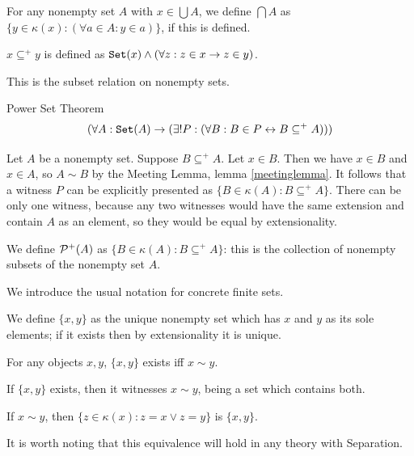 \documentclass[12pt]{article}
\begin{document}
\begin{dfn}  For any nonempty set $A$ with $x \in \bigcup A$, we define  %
$\bigcap A$ as $\{y \in \kappa(x):(\forall a \in A:y \in a)\}$, if this is defined.\end{dfn}

\begin{dfn}  $x \subseteq^+ y$ is defined as ${\tt Set}(x) \wedge (\forall z:z \in x \rightarrow z \in y)$.\end{dfn}  This is the subset relation on nonempty sets.

\begin{thm} Power Set Theorem   $$(\forall A:{\tt Set}(A) \rightarrow (\exists! P:(\forall B:B \in P \leftrightarrow B \subseteq^+ A)))$$  
\end{thm}
  

\Proof

Let $A$ be a nonempty set.  Suppose $B \subseteq^+ A$.  Let $x \in B$.
Then we have $x \in B$ and $x \in A$, so $A \sim B$ by the Meeting
Lemma, lemma \ref{meetinglemma}.  It follows that a witness $P$ can
be explicitly presented as $\{B \in \kappa(A):B \subseteq^+ A\}$.  There
can be only one witness, because any two witnesses would have the same
extension and contain $A$ as an element, so they would be equal by extensionality. \endproof

We define ${\cal P}^+(A)$ as $\{B \in \kappa(A):B \subseteq^+ A\}$:  this is the collection of nonempty subsets of the nonempty set $A$. 

\medskip


We introduce the usual notation for concrete finite sets.

\begin{dfn}
  We define $\{x,y\}$ as the unique nonempty set which has $x$ and $y$
  as its sole elements; if it exists then by extensionality it is
  unique.
\end{dfn}

\begin{thm}  For any objects $x,y$, $\{x,y\}$ exists iff $x \sim y$.\end{thm}

\Proof

If $\{x,y\}$ exists, then it witnesses $x \sim y$, being a set which contains both.

If $x \sim y$, then $\{z \in \kappa(x):z=x \vee z=y\}$ is $\{x,y\}$.

\endproof

It is worth noting that this equivalence will hold in any theory with Separation.
\end{document}
